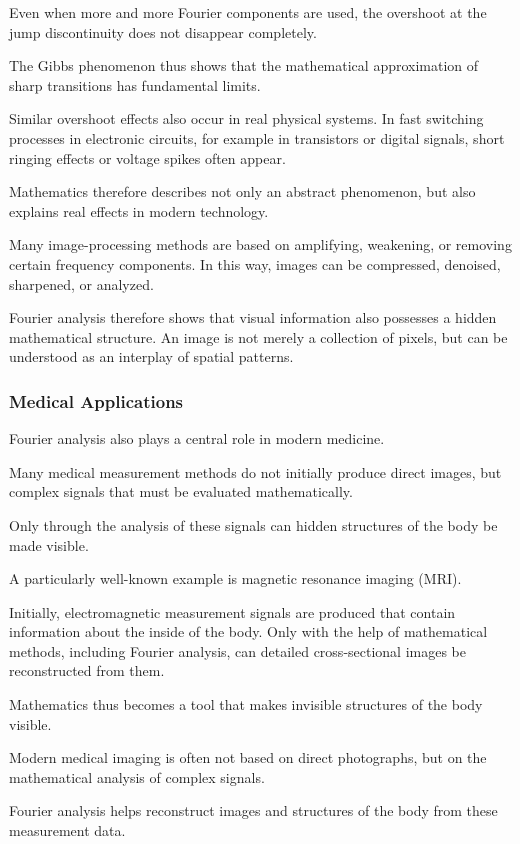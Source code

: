 Even when more and more Fourier components are used,
the overshoot at the jump discontinuity does not disappear completely.

The Gibbs phenomenon thus shows
that the mathematical approximation of sharp transitions
has fundamental limits.

Similar overshoot effects also occur in real physical systems.
In fast switching processes in electronic circuits,
for example in transistors or digital signals,
short ringing effects or voltage spikes often appear.

Mathematics therefore describes not only an abstract phenomenon,
but also explains real effects in modern technology.

Many image-processing methods are based on
amplifying,
weakening,
or removing certain frequency components.
In this way, images can be compressed,
denoised,
sharpened,
or analyzed.

Fourier analysis therefore shows
that visual information also possesses a hidden mathematical structure.
An image is not merely a collection of pixels,
but can be understood as an interplay of spatial patterns.

\subsubsection*{Medical Applications}

Fourier analysis also plays a central role in modern medicine.

Many medical measurement methods do not initially produce direct images,
but complex signals
that must be evaluated mathematically.

Only through the analysis of these signals
can hidden structures of the body be made visible.

\medskip

A particularly well-known example is magnetic resonance imaging (MRI).

Initially, electromagnetic measurement signals are produced
that contain information about the inside of the body.
Only with the help of mathematical methods,
including Fourier analysis,
can detailed cross-sectional images be reconstructed from them.

Mathematics thus becomes a tool
that makes invisible structures of the body visible.

\begin{PhysicsBox}
	\small
	\label{box:fourier-medizinische-bildgebung}
	Modern medical imaging is often not based on direct photographs,
	but on the mathematical analysis of complex signals.
	
	Fourier analysis helps reconstruct images and structures of the body
	from these measurement data.
\end{PhysicsBox}

